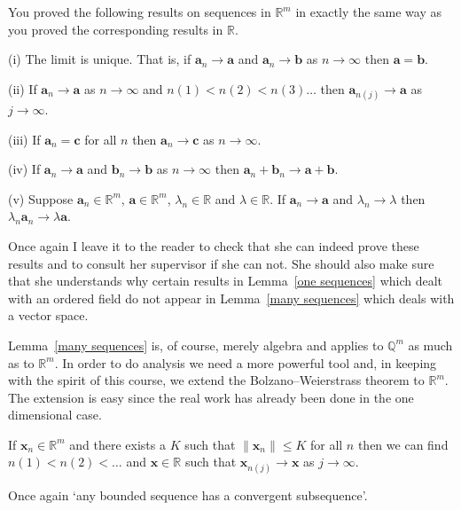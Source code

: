 You proved the following results on sequences
in ${\mathbb R}^{m}$  in exactly the same way as
you proved the corresponding results in ${\mathbb R}$.
\begin{lemma}\label{many sequences}
(i) The limit is unique. That is, if 
$\mathbf{a}_{n}\rightarrow \mathbf{a}$
and $\mathbf{a}_{n}\rightarrow \mathbf{b}$
as $n\rightarrow\infty$
then $\mathbf{a}=\mathbf{b}$.

(ii) If $\mathbf{a}_{n}\rightarrow \mathbf{a}$
as $n\rightarrow\infty$
and $n(1)<n(2)<n(3)\ldots$ then
$\mathbf{a}_{n(j)}\rightarrow \mathbf{a}$ 
as $j\rightarrow\infty$.

(iii) If $\mathbf{a}_{n}=\mathbf{c}$ for all $n$ 
then $\mathbf{a}_{n}\rightarrow \mathbf{c}$
as $n\rightarrow\infty$.

(iv) If $\mathbf{a}_{n}\rightarrow \mathbf{a}$
and $\mathbf{b}_{n}\rightarrow\mathbf{b}$
as $n\rightarrow\infty$ then
$\mathbf{a}_{n}+\mathbf{b}_{n}
\rightarrow \mathbf{a}+\mathbf{b}$.

(v) Suppose $\mathbf{a}_{n}\in {\mathbb R}^{m}$,
$\mathbf{a}\in {\mathbb R}^{m}$,
$\lambda_{n}\in {\mathbb R}$
and $\lambda\in {\mathbb R}$. 
If $\mathbf{a}_{n}\rightarrow \mathbf{a}$
and $\lambda_{n}\rightarrow\lambda$ then
$\lambda_{n}\mathbf{a}_{n}\rightarrow 
\lambda\mathbf{a}$.


\end{lemma}
Once again I leave it to the reader to check that
she can indeed prove these results and to
consult her supervisor if she can not. She should also
make sure that she understands why certain results
in Lemma~\ref{one sequences} which dealt with
an ordered field do not appear in Lemma~\ref{many sequences}
which deals with a vector space.

Lemma~\ref{many sequences} is, of course, merely algebra
and applies to ${\mathbb Q}^{m}$ as much as to 
${\mathbb R}^{m}$. In order to do analysis we need
a more powerful tool  and, in keeping with the spirit
of this course, we extend the Bolzano--Weierstrass
theorem to ${\mathbb R}^{m}$. The extension is easy
since the real work has already been done in the one dimensional
case.
\begin{theorem}\label{many Bolzano}
If $\mathbf{x}_{n}\in{\mathbb R}^{m}$ and there exists a $K$
such that $\|\mathbf{x}_{n}\|\leq K$ for all $n$ then we can find
$n(1)<n(2)<\ldots$ and $\mathbf{x}\in{\mathbb R}$ such that
$\mathbf{x}_{n(j)}\rightarrow \mathbf{x}$ as $j\rightarrow\infty$.
\end{theorem}
Once again `any bounded sequence has a convergent subsequence'.

